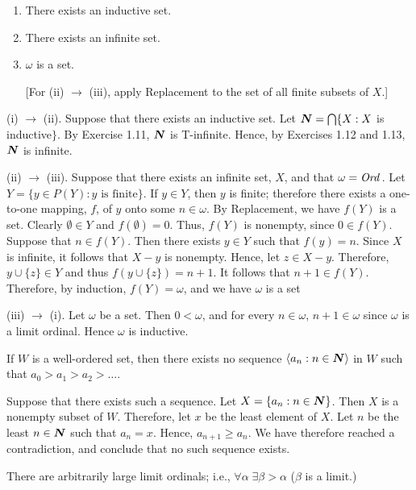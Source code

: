 \begin{enumerate}
\renewcommand{\labelenumii}{(\roman{enumii})}
\item
There exists an inductive set.
\item
There exists an infinite set.
\item
$\omega$ is a set.

[For (ii) $\rightarrow$ (iii), apply Replacement to the set of all finite 
subsets of $X$.]
\end{enumerate}
\begin{solution}
(i) $\rightarrow$ (ii). Suppose that there exists an inductive set. Let 
$\boldsymbol{N} = \bigcap \{ X : X$ is inductive$\}$. By Exercise 1.11, $\boldsymbol{N}$ is T-infinite.
Hence, by Exercises 1.12 and 1.13, $\boldsymbol{N}$ is infinite.

(ii) $\rightarrow$ (iii). Suppose that there exists an infinite set, $X$, and 
that $\omega = \textit{Ord\,}$. Let $Y = \{ y \in P(Y) : y \text{ is finite} \}$. If 
$y \in Y$, then $y$ is finite; therefore there exists a one-to-one mapping, 
$f$, of $y$ onto some $n \in \omega$. By Replacement, we have $f(Y)$ is a set. 
Clearly $\emptyset \in Y$ and $f(\emptyset) = 0$. Thus, $f(Y)$ is nonempty, 
since $0 \in f(Y)$. Suppose that $n \in f(Y)$. Then there exists $y \in Y$ such
that $f(y) = n$. Since $X$ is infinite, it follows that $X - y$ is nonempty. 
Hence, let $z \in X - y$. Therefore, $y \cup \{ z \} \in Y$ and thus 
$f(y \cup \{ z \}) = n + 1$. It follows that $n + 1 \in f(Y)$. Therefore, by 
induction, $f(Y) = \omega$, and we have $\omega$ is a set

(iii) $\rightarrow$ (i). Let $\omega$ be a set. Then $0 < \omega$, and for 
every $n \in \omega$, $n + 1 \in \omega$ since $\omega$ is a limit ordinal. 
Hence $\omega$ is inductive.
\end{solution}

 If $W$ is a well-ordered set, then there exists no sequence 
$\langle a_n : n \in \boldsymbol{N} \rangle$ in $W$ such that $a_0 > a_1 > a_2 > \ldots$.
\begin{solution}
Suppose that there exists such a sequence. Let $X = \{ a_n : n \in \boldsymbol{N} \}$. Then
$X$ is a nonempty subset of $W$. Therefore, let $x$ be the least element of 
$X$. Let $n$ be the least $n \in \boldsymbol{N}$ such that $a_n = x$. Hence, 
$a_{n + 1} \geq a_n$. We have therefore reached a contradiction, and conclude 
that no such sequence exists.
\end{solution}

 There are arbitrarily large limit ordinals; i.e., 
$\forall \alpha \; \exists \beta > \alpha$ ($\beta$ is a limit.)

